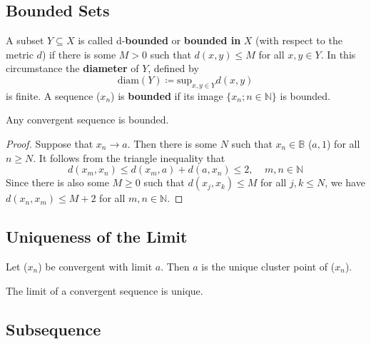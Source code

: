 \subsection*{Bounded Sets}

\begin{definition}
    A subset \(Y \subseteq X\) is called d-\textbf{bounded} or \textbf{bounded in } \(X\)
    (with respect to the metric \(d\)) if there is some \(M > 0\) such that 
    \(d\left(x, y\right) \leq M\) for all \(x, y \in Y\). In this circumstance the 
    \textbf{diameter} of \(Y\), defined by 
    \[
        \text{diam}(Y) \coloneqq \displaystyle{\text{sup}_{x, y \in Y}}d(x, y)  
    \]
    is finite. A sequence (\(x_n\)) is \textbf{bounded} if its image 
    \(\{x_n ; n \in \mathbb{N}\}\) is bounded. 
\end{definition}

\begin{proposition}
    Any convergent sequence is bounded. 
\end{proposition}

\begin{proof}
    Suppose that \(x_n \to a\). Then there is some \(N\) such that \(x_n \in \mathbb{B}\)
    (\(a, 1\)) for all \(n \geq N\). It follows from the triangle inequality that
    \[
        d(x_m, x_n) \leq d(x_m, a) + d(a, x_n) \leq 2, \:\:\:\:\: m,n \in \mathbb{N}
    \]
    Since there is also some \(M \geq 0\) such that \(d\left(x_j, x_k\right) \leq M\)
    for all \(j, k \leq N\), we have \(d\left(x_n, x_m\right) \leq M + 2\) for all
    \(m, n \in \mathbb{N}\). 
\end{proof}

\subsection*{Uniqueness of the Limit}

\begin{proposition}
    Let (\(x_n\)) be convergent with limit \(a\). Then \(a\) is the unique cluster point 
    of (\(x_n\)). 
\end{proposition}

\begin{corollary}
    The limit of a convergent sequence is unique. 
\end{corollary}

\subsection*{Subsequence}

